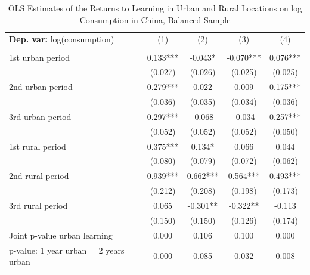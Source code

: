 \begin{table}[htbp] \centering \begin{threeparttable}
 \caption{OLS Estimates of the Returns to Learning in Urban and Rural Locations on log Consumption in China, Balanced Sample} 
 \label{tab:OLS_CHN_cons_learning_bal} 
\begin{tabular}{l cccc} \toprule  \textbf{Dep. var:}  log(consumption) 
                    &\multicolumn{1}{c}{(1)}   &\multicolumn{1}{c}{(2)}   &\multicolumn{1}{c}{(3)}   &\multicolumn{1}{c}{(4)}   \\
                    &               &               &               &               \\
\addlinespace
1st urban period    &       0.133***&      -0.043*  &      -0.070***&       0.076***\\
                    &     (0.027)   &     (0.026)   &     (0.025)   &     (0.025)   \\
\addlinespace
2nd urban period    &       0.279***&       0.022   &       0.009   &       0.175***\\
                    &     (0.036)   &     (0.035)   &     (0.034)   &     (0.036)   \\
\addlinespace
3rd urban period    &       0.297***&      -0.068   &      -0.034   &       0.257***\\
                    &     (0.052)   &     (0.052)   &     (0.052)   &     (0.050)   \\
\addlinespace
1st rural period    &       0.375***&       0.134*  &       0.066   &       0.044   \\
                    &     (0.080)   &     (0.079)   &     (0.072)   &     (0.062)   \\
\addlinespace
2nd rural period    &       0.939***&       0.662***&       0.564***&       0.493***\\
                    &     (0.212)   &     (0.208)   &     (0.198)   &     (0.173)   \\
\addlinespace
3rd rural period    &       0.065   &      -0.301** &      -0.322** &      -0.113   \\
                    &     (0.150)   &     (0.150)   &     (0.126)   &     (0.174)   \\
\addlinespace
Joint p-value urban learning&       0.000   &       0.106   &       0.100   &       0.000   \\
p-value: 1 year urban = 2 years urban&       0.000   &       0.085   &       0.032   &       0.008   \\

\end{tabular}
\end{threeparttable}
\end{table}
